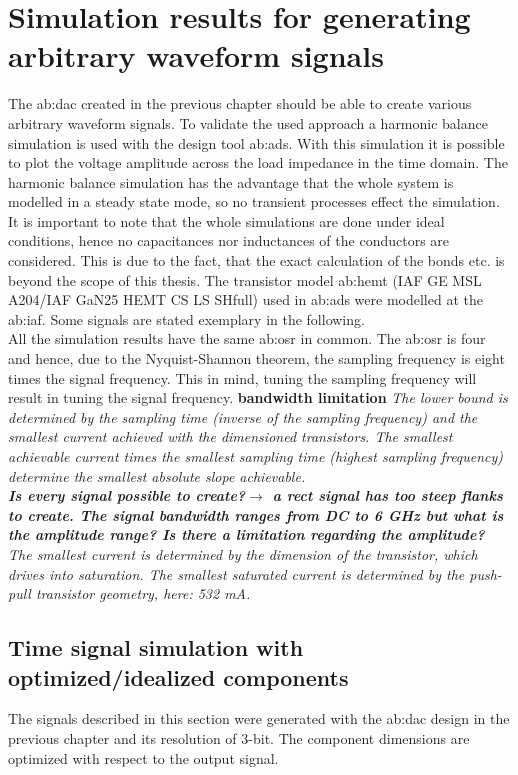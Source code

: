 \chapter{Simulation results for generating arbitrary waveform signals}
The \gls{ab:dac} created in the previous chapter should be able to create various arbitrary waveform signals.
 To validate the used approach a harmonic balance simulation is used with the design tool \gls{ab:ads}.
  With this simulation it is possible to plot the voltage amplitude across the load impedance in the time domain.
   The harmonic balance simulation has the advantage that the whole system is modelled in a steady state mode, so no transient processes effect the simulation.
    It is important to note that the whole simulations are done under ideal conditions, hence no capacitances nor inductances of the conductors are considered.
     This is due to the fact, that the exact calculation of the bonds etc. is beyond the scope of this thesis.
The transistor model \gls{ab:hemt} (IAF GE MSL A204/IAF GaN25 HEMT CS LS SHfull) used in \gls{ab:ads} were modelled at the \gls{ab:iaf}.
Some signals are stated exemplary in the following.\\
All the simulation results have the same \gls{ab:osr} in common.
The \gls{ab:osr} is four and hence, due to the Nyquist-Shannon theorem, the sampling frequency is eight times the signal frequency.
This in mind, tuning the sampling frequency will result in tuning the signal frequency. \textbf{bandwidth limitation}
\textit{The lower bound is determined by the sampling time (inverse of the sampling frequency) and the smallest current achieved with the dimensioned transistors.
 The smallest achievable current times the smallest sampling time (highest sampling frequency) determine the smallest absolute slope achievable. \\
 \textbf{Is every signal possible to create?$\rightarrow$ a rect signal has too steep flanks to create. The signal bandwidth ranges from DC to 6 GHz but what is the amplitude range? Is there a limitation regarding the amplitude?}
\\
The smallest current is determined by the dimension of the transistor, which drives into saturation. 
The smallest saturated current is determined by the push-pull transistor geometry, here: 532 mA.}

\section{Time signal simulation with optimized/idealized components}
 The signals described in this section were generated with the \gls{ab:dac} design in the previous chapter and its resolution of 3-bit. 
The component dimensions are optimized with respect to the output signal.  

